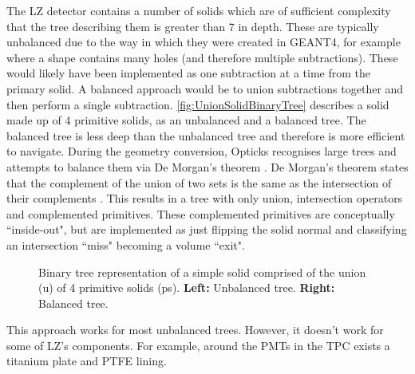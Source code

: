 \par
The LZ detector contains a number of solids which are of sufficient complexity that the tree describing them is greater than 7 in depth.
These are typically unbalanced due to the way in which they were created in GEANT4, for example where a shape contains many holes (and therefore multiple subtractions).
These would likely have been implemented as one subtraction at a time from the primary solid.
A balanced approach would be to union subtractions together and then perform a single subtraction.
\autoref{fig:UnionSolidBinaryTree} describes a solid made up of 4 primitive solids, as an unbalanced and a balanced tree.
The balanced tree is less deep than the unbalanced tree and therefore is more efficient to navigate.
During the geometry conversion, Opticks recognises large trees and attempts to balance them via De Morgan's theorem \cite{Opticks_CHEP_2019_ref}.
De Morgan's theorem states that the complement of the union of two sets is the same as the intersection of their complements \cite{demorgans_law_ref}.
This results in a tree with only union, intersection operators and complemented primitives.
These complemented primitives are conceptually ``inside-out", but are implemented as just flipping the solid normal and classifying an intersection ``miss" becoming a volume ``exit".
\begin{figure}
\centering 
{}
\caption{Binary tree representation of a simple solid comprised of the union (u) of 4 primitive solids (ps). \textbf{Left:} Unbalanced tree. \textbf{Right:} Balanced tree.}
\label{fig:UnionSolidBinaryTree}
\end{figure}
\par
This approach works for most unbalanced trees. 
However, it doesn't work for some of LZ's components.
For example, around the PMTs in the TPC exists a titanium plate and PTFE lining.
